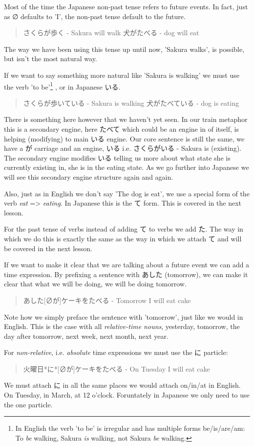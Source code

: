 \documentclass[11pt]{article}
\begin{document}
Most of the time the Japanese non-past tense refers to future events. In fact, just as ∅ defaults to 'I', the non-past tense default to the future.
\begin{quote}
さくらが歩く - Sakura will walk
犬がたべる - dog will eat
\end{quote}
The way we have been using this tense up until now, 'Sakura walks', is possible, but isn't the most natural way.

If we want to say something more natural like 'Sakura is walking' we must use the verb 'to be'\footnote{In English the verb 'to be' is irregular and has multiple forms be/is/are/am: To \emph{be} walking, Sakura \emph{is} walking, not Sakura \emph{be} walking.} , or in Japanese いる.
\begin{quote}
さくらが歩いている - Sakura is walking
犬がたべている - dog is eating
\end{quote}
There is something here however that we haven't yet seen. In our train metaphor this is a secondary engine, here たべて which could be an engine in of itself, is helping (modifying) to main いる engine. Our core sentence is still the same, we have a が carriage and an engine, いる i.e. さくらがいる - Sakura is (existing). The secondary engine modifies いる telling us more about what state she is currently existing in, she is in the eating state. As we go further into Japanese we will see this secondary engine structure again and again.

Also, just as in English we don't say 'The dog is eat', we use a special form of the verb \emph{eat} => \emph{eating}. In Japanese this is the て form. This is covered in the next lesson.

For the past tense of verbs instead of adding て to verbs we add た. The way in which we do this is exactly the same as the way in which we attach て and will be covered in the next lesson.

If we want to make it clear that we are talking about a future event we can add a time expression. By prefixing a sentence with あした (tomorrow), we can make it clear that what we will be doing, we will be doing tomorrow.
\begin{quote}
あした[∅が]ケーキをたべる - Tomorrow I will eat cake
\end{quote}
Note how we simply preface the sentence with 'tomorrow', just like we would in English. This is the case with all \emph{relative-time nouns}, yesterday, tomorrow, the day after tomorrow, next week, next month, next year.

For \emph{non-relative}, i.e. \emph{absolute} time expressions we must use the に particle:
\begin{quote}
火曜日*に*[∅が]ケーキをたべる - On Tuesday I will eat cake
\end{quote}
We must attach に in all the same places we would attach on/in/at in English. On Tuesday, in March, at 12 o'clock. Foruntately in Japanese we only need to use the one particle.
\end{document}
